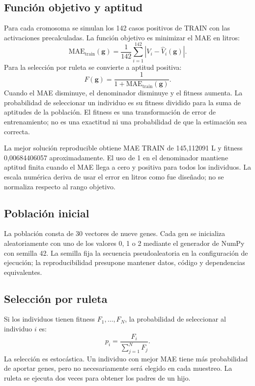 \documentclass[11pt,letterpaper]{article}
\newcommand{\MAE}{\mathrm{MAE}}
\begin{document}
\subsection{Función objetivo y aptitud}
Para cada cromosoma se simulan los 142 casos positivos de TRAIN con las activaciones precalculadas. La función objetivo es minimizar el MAE en litros:
\begin{equation}
  \MAE_{\mathrm{train}}(\mathbf{g})=\frac{1}{142}\sum_{i=1}^{142}|V_i-\widehat V_i(\mathbf{g})|.
\end{equation}
Para la selección por ruleta se convierte a aptitud positiva:
\begin{equation}
  F(\mathbf{g})=\frac{1}{1+\MAE_{\mathrm{train}}(\mathbf{g})}.
  \label{eq:fitness}
\end{equation}
Cuando el MAE disminuye, el denominador disminuye y el fitness aumenta. La probabilidad de seleccionar un individuo es su fitness dividido para la suma de aptitudes de la población. El fitness es una transformación de error de entrenamiento; no es una exactitud ni una probabilidad de que la estimación sea correcta.

La mejor solución reproducible obtiene MAE TRAIN de 145,112091 L y fitness 0,00684406057 aproximadamente. El uso de 1 en el denominador mantiene aptitud finita cuando el MAE llega a cero y positiva para todos los individuos. La escala numérica deriva de usar el error en litros como fue diseñado; no se normaliza respecto al rango objetivo.

\subsection{Población inicial}
La población consta de 30 vectores de nueve genes. Cada gen se inicializa aleatoriamente con uno de los valores 0, 1 o 2 mediante el generador de NumPy con semilla 42. La semilla fija la secuencia pseudoaleatoria en la configuración de ejecución; la reproducibilidad presupone mantener datos, código y dependencias equivalentes.

\subsection{Selección por ruleta}
Si los individuos tienen fitness $F_1,\ldots,F_N$, la probabilidad de seleccionar al individuo $i$ es:
\begin{equation}
  p_i=\frac{F_i}{\sum_{j=1}^{N}F_j}.
\end{equation}
La selección es estocástica. Un individuo con mejor MAE tiene más probabilidad de aportar genes, pero no necesariamente será elegido en cada muestreo. La ruleta se ejecuta dos veces para obtener los padres de un hijo.
\end{document}

